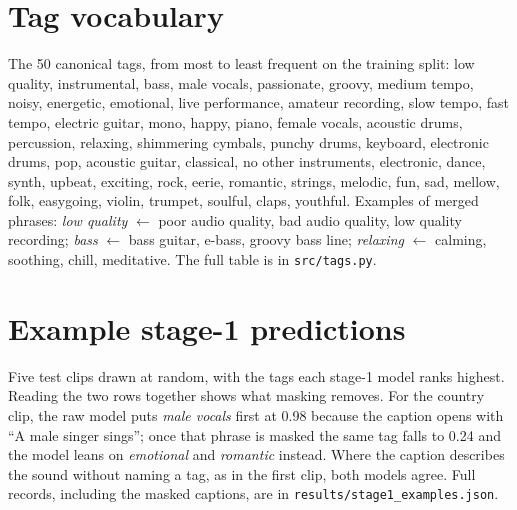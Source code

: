\documentclass{article}
\begin{document}
\appendix

\section{Tag vocabulary}
\label{app:tags}

The 50 canonical tags, from most to least frequent on the training split: low quality, instrumental, bass, male
vocals, passionate, groovy, medium tempo, noisy, energetic, emotional, live performance, amateur recording, slow tempo,
fast tempo, electric guitar, mono, happy, piano, female vocals, acoustic drums, percussion, relaxing, shimmering
cymbals, punchy drums, keyboard, electronic drums, pop, acoustic guitar, classical, no other instruments, electronic,
dance, synth, upbeat, exciting, rock, eerie, romantic, strings, melodic, fun, sad, mellow, folk, easygoing, violin,
trumpet, soulful, claps, youthful. Examples of merged phrases: \emph{low quality} $\leftarrow$ poor audio quality, bad
audio quality, low quality recording; \emph{bass} $\leftarrow$ bass guitar, e-bass, groovy bass line; \emph{relaxing}
$\leftarrow$ calming, soothing, chill, meditative. The full table is in \texttt{src/tags.py}.

\section{Example stage-1 predictions}
\label{app:examples}

Five test clips drawn at random, with the tags each stage-1 model ranks highest. Reading the two rows together shows
what masking removes. For the country clip, the raw model puts \emph{male vocals} first at 0.98 because the caption
opens with ``A male singer sings''; once that phrase is masked the same tag falls to 0.24 and the model leans on
\emph{emotional} and \emph{romantic} instead. Where the caption describes the sound without naming a tag, as in the
first clip, both models agree. Full records, including the masked captions, are in
\texttt{results/stage1\_examples.json}.
\end{document}
